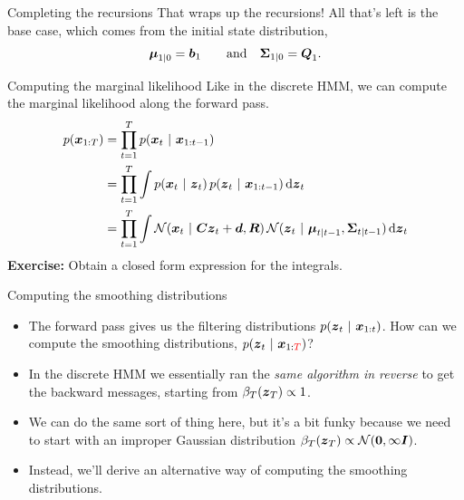 \documentclass[aspectratio=169]{beamer}
\begin{document}
\begin{frame}[t]{Completing the recursions}
    That wraps up the recursions! All that's left is the base case, which comes from the initial state distribution, 
    \begin{align}
        \boldsymbol{\mu}_{1|0} = \boldsymbol{b}_1 \qquad \text{and} \quad \boldsymbol{\Sigma}_{1|0} = \boldsymbol{Q}_1.
    \end{align}
\end{frame}
    
\begin{frame}[t]{Computing the marginal likelihood}
    Like in the discrete HMM, we can compute the marginal likelihood along the forward pass.
    \begin{align}
    p(\boldsymbol{x}_{1:T}) 
    &= \prod_{t=1}^T p(\boldsymbol{x}_t ~\vert~ \boldsymbol{x}_{1:t-1}) \\
    &= \prod_{t=1}^T \int p(\boldsymbol{x}_t ~\vert~ \boldsymbol{z}_t) \, p(\boldsymbol{z}_t ~\vert~ \boldsymbol{x}_{1:t-1}) \mathop{}\!\mathrm{d} \boldsymbol{z}_t \\
    &= \prod_{t=1}^T \int \mathcal{N}(\boldsymbol{x}_t ~\vert~ \boldsymbol{C} \boldsymbol{z}_t + \boldsymbol{d}, \boldsymbol{R}) \, \mathcal{N}(\boldsymbol{z}_t ~\vert~ \boldsymbol{\mu}_{t|t-1}, \boldsymbol{\Sigma}_{t|t-1}) \mathop{}\!\mathrm{d} \boldsymbol{z}_t 
    \end{align}
    \textbf{Exercise: } Obtain a closed form expression for the integrals.
\end{frame}
    
\begin{frame}{Computing the smoothing distributions}
    \begin{itemize}
        \item The forward pass gives us the filtering distributions $p(\boldsymbol{z}_t ~\vert~ \boldsymbol{x}_{1:t})$. How can we compute the smoothing distributions, $p(\boldsymbol{z}_t ~\vert~ \boldsymbol{x}_{1:\textcolor{red}{T}})$?
    
        \item In the discrete HMM we essentially ran the \textit{same algorithm in reverse} to get the backward messages, starting from $\beta_{T}(\boldsymbol{z}_T) \propto 1$.
    
        \item We can do the same sort of thing here, but it's a bit funky because we need to start with an improper Gaussian distribution $\beta_T(\boldsymbol{z}_T) \propto \mathcal{N}(\boldsymbol{0}, \infty \boldsymbol{I})$.
        
        \item Instead, we'll derive an alternative way of computing the smoothing distributions.
    \end{itemize}
\end{frame}
    
\end{document}
